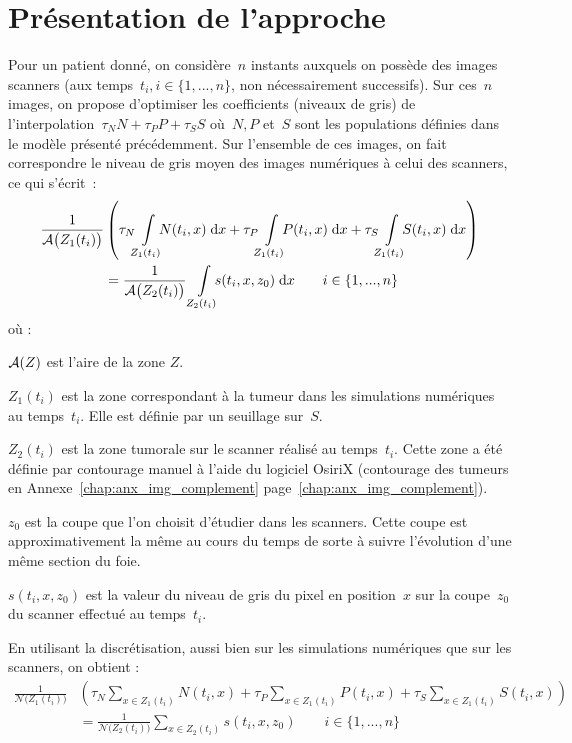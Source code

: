 \documentclass[main.tex]{subfiles}
\begin{document}
\section{Présentation de l'approche}
Pour un patient donné, on considère~$n$ instants auxquels on possède des images scanners (aux temps~$t_i, i\in \{ 1,...,n \}$, non nécessairement successifs). Sur ces~$n$ images, on propose d'optimiser les coefficients (niveaux de gris) de l'interpolation~$\tau_N N + \tau_P P + \tau_S S$ où~$N, P$ et~$S$ sont les populations définies dans le modèle présenté précédemment. Sur l'ensemble de ces images, on fait correspondre le niveau de gris moyen des images numériques à celui des scanners, ce qui s'écrit~:
\begin{equation}
\label{eq:optim_grey_integ_aire}
\begin{aligned}
\frac{1}{\aire\big(Z_1(t_i)\big)}&\left( \tau_N\intperso{Z_1(t_i)}N(t_i,x) \dx + \tau_P\intperso{Z_1(t_i)}P(t_i,x) \dx + \tau_S\intperso{Z_1(t_i)} S(t_i,x) \dx \right) \\
&= \frac{1}{\aire\big(Z_2(t_i)\big)} \ \intperso{Z_2(t_i)} s(t_i,x,z_0) \dx \qquad i \in \{1,...,n\}
\end{aligned}
\end{equation}
où : \begin{myitemize}
\item $\mathcal{A}(Z)$ est l'aire de la zone $Z$.
\item $Z_1(t_i)$ est la zone correspondant à la tumeur dans les simulations numériques au temps~$t_i$. Elle est définie par un seuillage sur~$S$.
\item $Z_2(t_i)$ est la zone tumorale sur le scanner réalisé au temps~$t_i$. Cette zone a été définie par contourage manuel à l'aide du logiciel OsiriX (\cf contourage des tumeurs en Annexe~\ref{chap:anx_img_complement} page~\ref{chap:anx_img_complement}).
\item $z_0$ est la coupe que l'on choisit d'étudier dans les scanners. Cette coupe est approximativement la même au cours du temps de sorte à suivre l'évolution d'une même section du foie. 
\item $s(t_i,x,z_0)$ est la valeur du niveau de gris du pixel en position~$x$ sur la coupe~$z_0$ du scanner effectué au temps~$t_i$.
\end{myitemize}
En utilisant la discrétisation, aussi bien sur les simulations numériques que sur les scanners, on obtient :
\begin{equation}
\label{eq:optim_grey_eq_discr}
\begin{aligned}
\frac{1}{\mathcal{N}\big(Z_1(t_i)\big)}&\left( \tau_N\!\!\sum_{x\in Z_1(t_i)}\!\!N(t_i,x) + \tau_P\!\!\sum_{x\in Z_1(t_i)}\!\!P(t_i,x) + \tau_S\!\!\sum_{x\in Z_1(t_i)}\!\!S(t_i,x) \right) \\
&= \frac{1}{\mathcal{N}\big(Z_2(t_i)\big)} \sum_{x\in Z_2(t_i)}\!\! s(t_i,x,z_0) \qquad i \in \{1,...,n\}
\end{aligned}
\end{equation}
\end{document}
